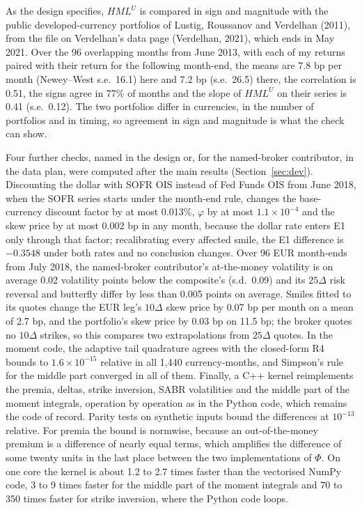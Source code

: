 \documentclass[11pt]{article}
\theoremstyle{result}
\newcommand{\HML}{\mathit{HML}}
\newcommand{\D}{\Delta}
\begin{document}
As the design specifies, $\HML^U$ is compared in sign and magnitude with the public developed-currency portfolios of Lustig, Roussanov and Verdelhan (2011), from the file on Verdelhan's data page (Verdelhan, 2021), which ends in May 2021. Over the 96 overlapping months from June 2013, with each of my returns paired with their return for the following month-end, the means are 7.8 bp per month (Newey--West s.e.\ 16.1) here and 7.2 bp (s.e.\ 26.5) there, the correlation is 0.51, the signs agree in 77\% of months and the slope of $\HML^U$ on their series is 0.41 (s.e.\ 0.12). The two portfolios differ in currencies, in the number of portfolios and in timing, so agreement in sign and magnitude is what the check can show.

Four further checks, named in the design or, for the named-broker contributor, in the data plan, were computed after the main results (Section~\ref{sec:dev}). Discounting the dollar with SOFR OIS instead of Fed Funds OIS from June 2018, when the SOFR series starts under the month-end rule, changes the base-currency discount factor by at most 0.013\%, $\varphi$ by at most $1.1\times10^{-4}$ and the skew price by at most 0.002 bp in any month, because the dollar rate enters E1 only through that factor; recalibrating every affected smile, the E1 difference is $-0.3548$ under both rates and no conclusion changes. Over 96 EUR month-ends from July 2018, the named-broker contributor's at-the-money volatility is on average 0.02 volatility points below the composite's (s.d.\ 0.09) and its $25\D$ risk reversal and butterfly differ by less than 0.005 points on average. Smiles fitted to its quotes change the EUR leg's $10\D$ skew price by 0.07 bp per month on a mean of 2.7 bp, and the portfolio's skew price by 0.03 bp on 11.5 bp; the broker quotes no $10\D$ strikes, so this compares two extrapolations from $25\D$ quotes. In the moment code, the adaptive tail quadrature agrees with the closed-form R4 bounds to $1.6\times10^{-15}$ relative in all 1,440 currency-months, and Simpson's rule for the middle part converged in all of them. Finally, a C++ kernel reimplements the premia, deltas, strike inversion, SABR volatilities and the middle part of the moment integrals, operation by operation as in the Python code, which remains the code of record. Parity tests on synthetic inputs bound the differences at $10^{-13}$ relative. For premia the bound is normwise, because an out-of-the-money premium is a difference of nearly equal terms, which amplifies the difference of some twenty units in the last place between the two implementations of $\Phi$. On one core the kernel is about 1.2 to 2.7 times faster than the vectorised NumPy code, 3 to 9 times faster for the middle part of the moment integrals and 70 to 350 times faster for strike inversion, where the Python code loops.
\end{document}
